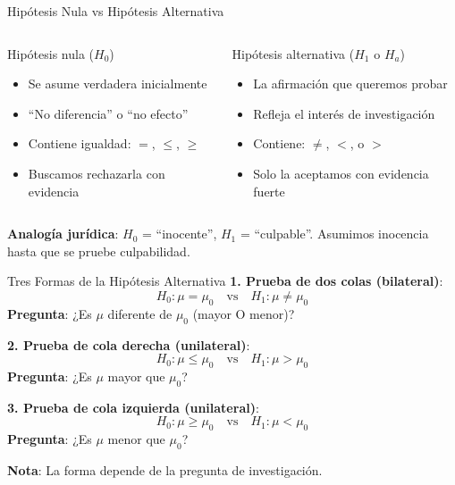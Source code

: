 \documentclass[aspectratio=169, 11pt]{beamer}
\begin{document}
\begin{frame}{Hipótesis Nula vs Hipótesis Alternativa}
\begin{columns}[T]
\begin{block}{Hipótesis nula ($H_0$)}
\begin{itemize}
  \item Se asume verdadera inicialmente
  \item ``No diferencia'' o ``no efecto''
  \item Contiene igualdad: $=$, $\leq$, $\geq$
  \item Buscamos \alert{rechazarla} con evidencia
\end{itemize}
\end{block}

\begin{block}{Hipótesis alternativa ($H_1$ o $H_a$)}
\begin{itemize}
  \item La afirmación que queremos probar
  \item Refleja el interés de investigación
  \item Contiene: $\neq$, $<$, o $>$
  \item Solo la aceptamos con \alert{evidencia fuerte}
\end{itemize}
\end{block}
\end{columns}

\vspace{0.3cm}
\textbf{Analogía jurídica}: $H_0$ = ``inocente'', $H_1$ = ``culpable''. Asumimos inocencia hasta que se pruebe culpabilidad.
\end{frame}

\begin{frame}{Tres Formas de la Hipótesis Alternativa}
\textbf{1. Prueba de dos colas (bilateral)}:
\[
H_0: \mu = \mu_0 \quad \text{vs} \quad H_1: \mu \neq \mu_0
\]
\textbf{Pregunta}: ¿Es $\mu$ \alert{diferente} de $\mu_0$ (mayor O menor)?

\vspace{0.3cm}
\textbf{2. Prueba de cola derecha (unilateral)}:
\[
H_0: \mu \leq \mu_0 \quad \text{vs} \quad H_1: \mu > \mu_0
\]
\textbf{Pregunta}: ¿Es $\mu$ \alert{mayor} que $\mu_0$?

\vspace{0.3cm}
\textbf{3. Prueba de cola izquierda (unilateral)}:
\[
H_0: \mu \geq \mu_0 \quad \text{vs} \quad H_1: \mu < \mu_0
\]
\textbf{Pregunta}: ¿Es $\mu$ \alert{menor} que $\mu_0$?

\vspace{0.3cm}
\textbf{Nota}: La forma depende de la pregunta de investigación.
\end{frame}
\end{document}
